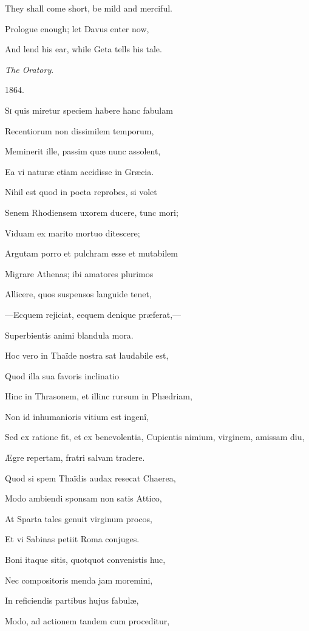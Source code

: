 They shall come short, be mild and merciful.

Prologue enough; let Davus enter now,

And lend his ear, while Geta tells his tale.

\emph{The Oratory}.

1864.


S\textsc{i} quis miretur speciem habere hanc fabulam

Recentiorum non dissimilem temporum,

Meminerit ille, passim quæ nunc assolent,

Ea vi naturæ etiam accidisse in Græcia.

Nihil est quod in poeta reprobes, si volet

Senem Rhodiensem uxorem ducere, tunc mori;

Viduam ex marito mortuo ditescere;

Argutam porro et pulchram esse et mutabilem

Migrare Athenas; ibi amatores plurimos

Allicere, quos suspensos languide tenet,

—Ecquem rejiciat, ecquem denique præferat,—

Superbientis animi blandula mora.

Hoc vero in Thaïde nostra sat laudabile est,

Quod illa sua favoris inclinatio

Hinc in Thrasonem, et illinc rursum in Phædriam,

Non id inhumanioris vitium est ingenî,

Sed ex ratione fit, et ex benevolentia, Cupientis nimium, virginem, amissam diu,

Ægre repertam, fratri salvam tradere.

Quod si spem Thaïdis audax resecat Chaerea,

Modo ambiendi sponsam non satis Attico,

At Sparta tales genuit virginum procos,

Et vi Sabinas petiit Roma conjuges.

Boni itaque sitis, quotquot convenistis huc,

Nec compositoris menda jam moremini,

In reficiendis partibus hujus fabulæ,

Modo, ad actionem tandem cum proceditur,

